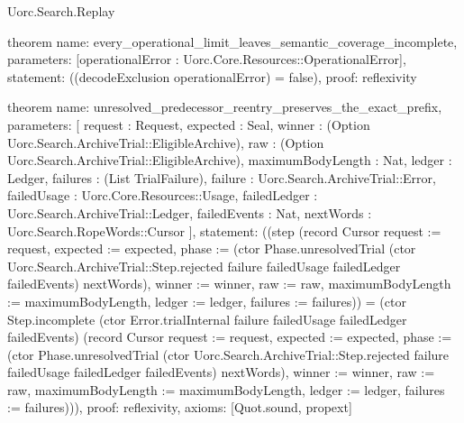 \begin{lexlean}{Uorc.Search.Replay}
\begin{semanticmodule}
theorem{
  name: every_operational_limit_leaves_semantic_coverage_incomplete,
  parameters: [operationalError : Uorc.Core.Resources::OperationalError],
  statement: ((decodeExclusion operationalError) = false),
  proof: reflexivity{}
}

theorem{
  name: unresolved_predecessor_reentry_preserves_the_exact_prefix,
  parameters: [
    request : Request,
    expected : Seal,
    winner : (Option Uorc.Search.ArchiveTrial::EligibleArchive),
    raw : (Option Uorc.Search.ArchiveTrial::EligibleArchive),
    maximumBodyLength : Nat,
    ledger : Ledger,
    failures : (List TrialFailure),
    failure : Uorc.Search.ArchiveTrial::Error,
    failedUsage : Uorc.Core.Resources::Usage,
    failedLedger : Uorc.Search.ArchiveTrial::Ledger,
    failedEvents : Nat,
    nextWords : Uorc.Search.RopeWords::Cursor
  ],
  statement: ((step (record Cursor {request := request, expected := expected, phase := (ctor Phase.unresolvedTrial (ctor Uorc.Search.ArchiveTrial::Step.rejected failure failedUsage failedLedger failedEvents) nextWords), winner := winner, raw := raw, maximumBodyLength := maximumBodyLength, ledger := ledger, failures := failures})) = (ctor Step.incomplete (ctor Error.trialInternal failure failedUsage failedLedger failedEvents) (record Cursor {request := request, expected := expected, phase := (ctor Phase.unresolvedTrial (ctor Uorc.Search.ArchiveTrial::Step.rejected failure failedUsage failedLedger failedEvents) nextWords), winner := winner, raw := raw, maximumBodyLength := maximumBodyLength, ledger := ledger, failures := failures}))),
  proof: reflexivity{},
  axioms: [Quot.sound, propext]
}
\end{semanticmodule}
\end{lexlean}
